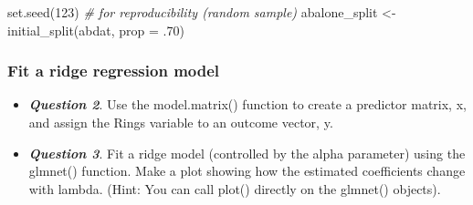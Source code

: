 \documentclass[
]{article}
\newenvironment{Shaded}{\begin{snugshade}}{\end{snugshade}}
\newcommand{\AttributeTok}[1]{\textcolor[rgb]{0.77,0.63,0.00}{#1}}
\newcommand{\CommentTok}[1]{\textcolor[rgb]{0.56,0.35,0.01}{\textit{#1}}}
\newcommand{\DecValTok}[1]{\textcolor[rgb]{0.00,0.00,0.81}{#1}}
\newcommand{\FunctionTok}[1]{\textcolor[rgb]{0.00,0.00,0.00}{#1}}
\newcommand{\NormalTok}[1]{#1}
\newcommand{\OtherTok}[1]{\textcolor[rgb]{0.56,0.35,0.01}{#1}}
\newcommand{\SpecialCharTok}[1]{\textcolor[rgb]{0.00,0.00,0.00}{#1}}
\providecommand{\tightlist}{%
  \setlength{\itemsep}{0pt}\setlength{\parskip}{0pt}}
\begin{document}
\begin{Shaded}
\begin{Highlighting}[]
\FunctionTok{set.seed}\NormalTok{(}\DecValTok{123}\NormalTok{)  }\CommentTok{\# for reproducibility (random sample)}
\NormalTok{abalone\_split }\OtherTok{\textless{}{-}} \FunctionTok{initial\_split}\NormalTok{(abdat, }\AttributeTok{prop =}\NormalTok{ .}\DecValTok{70}\NormalTok{)}
\end{Highlighting}
\end{Shaded}

\hypertarget{fit-a-ridge-regression-model}{%
\subsubsection{Fit a ridge regression
model}\label{fit-a-ridge-regression-model}}

\begin{itemize}
\tightlist
\item
  \textbf{\emph{Question 2}}. Use the model.matrix() function to create
  a predictor matrix, x, and assign the Rings variable to an outcome
  vector, y.
\end{itemize}

\begin{Shaded}
\end{Shaded}

\begin{itemize}
\tightlist
\item
  \textbf{\emph{Question 3}}. Fit a ridge model (controlled by the alpha
  parameter) using the glmnet() function. Make a plot showing how the
  estimated coefficients change with lambda. (Hint: You can call plot()
  directly on the glmnet() objects).
\end{itemize}
\end{document}
